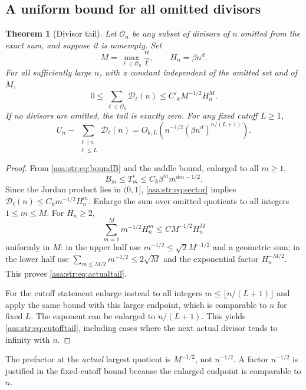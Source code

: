 \documentclass[11pt,letterpaper]{article}
\newtheorem{theorem}{Theorem}[section]
\theoremstyle{remark}\newtheorem{remark}[theorem]{Remark}
\numberwithin{equation}{section}
\begin{document}
\subsection{A uniform bound for all omitted divisors}
\begin{theorem}[Divisor tail]\label{asa:str:thm:tail}
Let $\mathcal O_n$ be any subset of divisors of $n$ omitted from the exact sum, and suppose it is nonempty. Set
\[
 M=\max_{\ell\in\mathcal O_n}\frac n\ell,\qquad H_n=\beta n^d.
\]
For all sufficiently large $n$, with a constant independent of the omitted set and of $M$,
\begin{equation}\label{asa:str:eq:actualtail}
 0\le\sum_{\ell\in\mathcal O_n}\mathcal D_\ell(n)
 \le C'_k M^{-1/2}H_n^M.
\end{equation}
If no divisors are omitted, the tail is exactly zero. For any fixed cutoff $L\ge1$,
\begin{equation}\label{asa:str:eq:cutofftail}
 U_n-\sum_{\substack{\ell\mid n\\\ell\le L}}\mathcal D_\ell(n)
 =O_{k,L}\left(n^{-1/2}(\beta n^d)^{n/(L+1)}\right).
\end{equation}
\end{theorem}
\begin{proof}
From \eqref{asa:str:eq:boundB} and the saddle bound, enlarged to all $m\ge1$,
\[
 B_m\le T^{\circ}_m\le C_k\beta^m m^{dm-1/2}.
\]
Since the Jordan product lies in $(0,1]$, \eqref{asa:str:eq:sector} implies
$\mathcal D_\ell(n)\le C_km^{-1/2}H_n^m$. Enlarge the sum over omitted quotients to all integers $1\le m\le M$. For $H_n\ge2$,
\[
 \sum_{m=1}^Mm^{-1/2}H_n^m\le C M^{-1/2}H_n^M
\]
uniformly in $M$: in the upper half use $m^{-1/2}\le\sqrt2M^{-1/2}$ and a geometric sum; in the lower half use $\sum_{m\le M/2}m^{-1/2}\le2\sqrt M$ and the exponential factor $H_n^{-M/2}$. This proves \eqref{asa:str:eq:actualtail}.

For the cutoff statement enlarge instead to all integers $m\le\lfloor n/(L+1)\rfloor$ and apply the same bound with this larger endpoint, which is comparable to $n$ for fixed $L$. The exponent can be enlarged to $n/(L+1)$. This yields \eqref{asa:str:eq:cutofftail}, including cases where the next actual divisor tends to infinity with $n$.
\end{proof}
The prefactor at the \emph{actual} largest quotient is $M^{-1/2}$, not $n^{-1/2}$. A factor $n^{-1/2}$ is justified in the fixed-cutoff bound because the enlarged endpoint is comparable to $n$.
\end{document}
